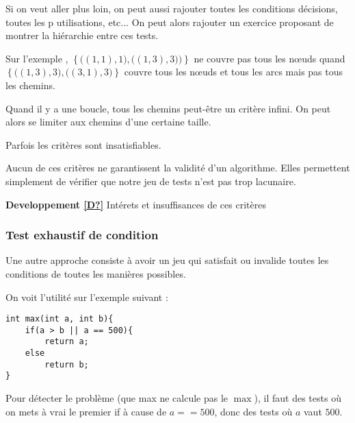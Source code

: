 \begin{com}
	Si on veut aller plus loin, on peut aussi rajouter toutes les conditions décisions, toutes les p utilisations, etc... On peut alors rajouter un exercice proposant de montrer la hiérarchie entre ces tests.
\end{com}

\begin{example}
	Sur l'exemple \label{3-1}, $\left\{ \big( (1,1), 1\big), \big((1,3), 3)\big)\right\} $ ne couvre pas tous les nœuds quand $\left\{ \big((1,3), 3), \big( (3, 1), 3 \big) \right\}$ couvre tous les nœuds et tous les arcs mais pas tous les chemins.
\end{example}

\begin{rem}
	Quand il y a une boucle, tous les chemins peut-être un critère infini. On peut alors se limiter aux chemins d'une certaine taille.
\end{rem}

\begin{rem}
	Parfois les critères sont insatisfiables.
\end{rem}

\begin{rem}
	Aucun de ces critères ne garantissent la validité d'un algorithme. Elles permettent simplement de vérifier que notre jeu de tests n'est pas trop lacunaire.
\end{rem}

\noindent \textbf{Developpement \ref{D?}} Intérets et insuffisances de ces critères

\subsubsection{Test exhaustif de condition}

\begin{idee}
	Une autre approche consiste à avoir un jeu qui satisfait ou invalide toutes les conditions de toutes les manières possibles.
\end{idee}

\begin{example}
	On voit l'utilité sur l'exemple suivant :\\
	\begin{minipage}{0.5\linewidth}
		\begin{lstlisting}[style=CStyle]
int max(int a, int b){
	if(a > b || a == 500){
        return a;
    else
        return b;
}
\end{lstlisting}
	\end{minipage}
	\begin{minipage}{0.5\linewidth}
		Pour détecter le problème (que max ne calcule pas le $\max$), il faut des tests où on mets à vrai le premier if à cause de $a == 500$, donc des tests où $a$ vaut $500$.
	\end{minipage}
\end{example}

